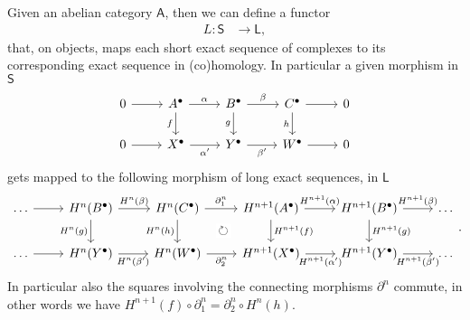 \begin{prop}
	Given an abelian category $\mathsf{A}$, then we can define a functor
	\begin{align}
		L\colon \mathsf{S} &\to \mathsf{L}
	,\end{align} 
	that, on objects, maps each short exact sequence of complexes to its corresponding exact
	sequence in (co)homology.
	In particular a given morphism in $\mathsf{S}$
	\begin{equation}
	\begin{tikzcd}
		0 \arrow[r, "", rightarrow] &
		A^\bullet \arrow[r, "\alpha", rightarrow] \arrow[d, "f"', rightarrow] &
		B^\bullet \arrow[r, "\beta", rightarrow] \arrow[d, "g"', rightarrow] &
		C^\bullet \arrow[r, "", rightarrow] \arrow[d, "h"', rightarrow] &
		0 \\
		0 \arrow[r, "", rightarrow] &
		X^\bullet \arrow[r, "\alpha'"', rightarrow] &
		Y^\bullet \arrow[r, "\beta'"', rightarrow] &
		W^\bullet \arrow[r, "", rightarrow] &
		0 
	\end{tikzcd}
	\end{equation} 
	gets mapped to the following morphism of long exact sequences, in $\mathsf{L}$ 
	\begin{equation*}
	\begin{tikzcd}[column sep = 2.4em]
		\ldots \arrow[r, "", rightarrow] &
		H^n(B^\bullet) \arrow[r, "H^n(\beta)", rightarrow] \arrow[d, "H^n(g)"', rightarrow] &
		H^n(C^\bullet) \arrow[r, "\partial_1^n", rightarrow] \arrow[d, "H^n(h)"', rightarrow] 
		\arrow[rd, "\circlearrowright" description, phantom, rightarrow] &
		H^{n+1}(A^\bullet) \arrow[r, "H^{n+1}(\alpha)", rightarrow] \arrow[d, "H^{n+1}(f)", rightarrow] &
		H^{n+1}(B^\bullet) \arrow[r, "H^{n+1}(\beta)", rightarrow] \arrow[d, "H^{n+1}(g)", rightarrow] &
		\ldots \\
		\ldots \arrow[r, "", rightarrow] &
		H^n(Y^\bullet) \arrow[r, "H^n(\beta')"', rightarrow] &
		H^n(W^\bullet) \arrow[r, "\partial_2^n"', rightarrow] &
		H^{n+1}(X^\bullet) \arrow[r, "H^{n+1}(\alpha')"', rightarrow] &
		H^{n+1}(Y^\bullet) \arrow[r, "H^{n+1}(\beta')"', rightarrow] &
		\ldots 
	\end{tikzcd}
	.\end{equation*} 
	In particular also the squares involving the connecting morphisms $\partial^n$ commute,
	in other words we have $H^{n+1}(f) \circ \partial_1^n = \partial_2^n \circ H^n(h)$.
\end{prop} 


